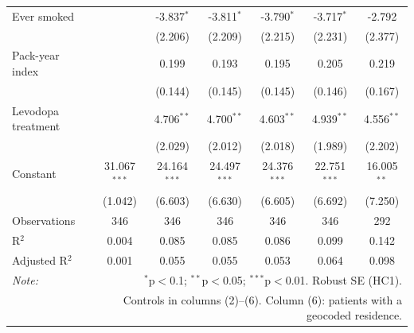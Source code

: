 \begin{tabular}{lcccccc}
Ever smoked &  & -3.837$^{*}$ & -3.811$^{*}$ & -3.790$^{*}$ & -3.717$^{*}$ & -2.792 \\
 &  & (2.206) & (2.209) & (2.215) & (2.231) & (2.377) \\
Pack-year index &  & 0.199 & 0.193 & 0.195 & 0.205 & 0.219 \\
 &  & (0.144) & (0.145) & (0.145) & (0.146) & (0.167) \\
Levodopa treatment &  & 4.706$^{**}$ & 4.700$^{**}$ & 4.603$^{**}$ & 4.939$^{**}$ & 4.556$^{**}$ \\
 &  & (2.029) & (2.012) & (2.018) & (1.989) & (2.202) \\
Constant & 31.067$^{***}$ & 24.164$^{***}$ & 24.497$^{***}$ & 24.376$^{***}$ & 22.751$^{***}$ & 16.005$^{**}$ \\
 & (1.042) & (6.603) & (6.630) & (6.605) & (6.692) & (7.250) \\
\hline
Observations & 346 & 346 & 346 & 346 & 346 & 292 \\
R$^2$ & 0.004 & 0.085 & 0.085 & 0.086 & 0.099 & 0.142 \\
Adjusted R$^2$ & 0.001 & 0.055 & 0.055 & 0.053 & 0.064 & 0.098 \\
\hline\hline
\textit{Note:} & \multicolumn{6}{r}{$^{*}$p$<$0.1; $^{**}$p$<$0.05; $^{***}$p$<$0.01. Robust SE (HC1).} \\
 & \multicolumn{6}{r}{Controls in columns (2)--(6). Column (6): patients with a geocoded residence.} \\
\end{tabular}
